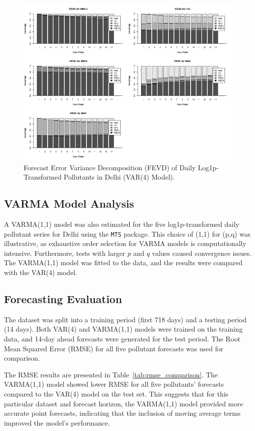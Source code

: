 \documentclass[fleqn,10pt]{SelfArx} %
\begin{document}
\begin{figure}[ht]
    \centering
    \includegraphics[width=\linewidth]{../analysis/assets/fevd_delhi.png}
    \caption{Forecast Error Variance Decomposition (FEVD) of Daily Log1p-Transformed Pollutants in Delhi (VAR(4) Model).}
    \label{fig:fevd_delhi}
\end{figure}

\subsection{VARMA Model Analysis}
A VARMA(1,1) model was also estimated for the five log1p-transformed daily pollutant series for Delhi using the \texttt{MTS} package. This choice of (1,1) for (p,q) was illustrative, as exhaustive order selection for VARMA models is computationally intensive. Furthermore, tests with larger $p$ and $q$ values caused convergence issues. The VARMA(1,1) model was fitted to the data, and the results were compared with the VAR(4) model.

\subsection{Forecasting Evaluation}
The dataset was split into a training period (first 718 days) and a testing period (14 days). Both VAR(4) and VARMA(1,1) models were trained on the training data, and 14-day ahead forecasts were generated for the test period. The Root Mean Squared Error (RMSE) for all five pollutant forecasts was used for comparison.

The RMSE results are presented in Table~\ref{tab:rmse_comparison}. The VARMA(1,1) model showed lower RMSE for all five pollutants' forecasts compared to the VAR(4) model on the test set. This suggests that for this particular dataset and forecast horizon, the VARMA(1,1) model provided more accurate point forecasts, indicating that the inclusion of moving average terms improved the model's performance.
\end{document}
